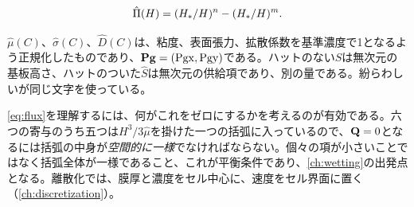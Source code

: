 \begin{equation}\label{eq:pihat}
  \hat{\Pi}(H) = (H_{*}/H)^{n} - (H_{*}/H)^{m}.
\end{equation}

$\hat{\mu}(C)$、$\hat{\sigma}(C)$、$\hat{D}(C)$は、粘度、表面張力、拡散係数を基準濃度で1となるよう正規化したものであり、$\mathbf{Pg} = (\mathrm{Pgx}, \mathrm{Pgy})$である。ハットのない$S$は無次元の基板高さ、ハットのついた$\hat{S}$は無次元の供給項であり、別の量である。紛らわしいが同じ文字を使っている。

\cref{eq:flux}を理解するには、何がこれをゼロにするかを考えるのが有効である。六つの寄与のうち五つは$H^{3}/3\hat{\mu}$を掛けた一つの括弧に入っているので、$\mathbf{Q} = 0$となるには括弧の中身が\emph{空間的に一様}でなければならない。個々の項が小さいことではなく括弧全体が一様であること、これが平衡条件であり、\cref{ch:wetting}の出発点となる。離散化では、膜厚と濃度をセル中心に、速度をセル界面に置く（\cref{ch:discretization}）。
